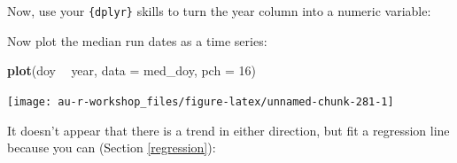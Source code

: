 \documentclass[]{book}
\newenvironment{Shaded}{\begin{snugshade}}{\end{snugshade}}
\newcommand{\CommentTok}[1]{\textcolor[rgb]{0.56,0.35,0.01}{\textit{#1}}}
\newcommand{\DataTypeTok}[1]{\textcolor[rgb]{0.13,0.29,0.53}{#1}}
\newcommand{\DecValTok}[1]{\textcolor[rgb]{0.00,0.00,0.81}{#1}}
\newcommand{\KeywordTok}[1]{\textcolor[rgb]{0.13,0.29,0.53}{\textbf{#1}}}
\newcommand{\NormalTok}[1]{#1}
\newcommand{\OperatorTok}[1]{\textcolor[rgb]{0.81,0.36,0.00}{\textbf{#1}}}
\newcommand{\StringTok}[1]{\textcolor[rgb]{0.31,0.60,0.02}{#1}}
\begin{document}
Now, use your \texttt{\{dplyr\}} skills to turn the year column into a numeric variable:

\begin{Shaded}
\end{Shaded}

Now plot the median run dates as a time series:

\begin{Shaded}
\begin{Highlighting}[]
\KeywordTok{plot}\NormalTok{(doy }\OperatorTok{~}\StringTok{ }\NormalTok{year, }\DataTypeTok{data =}\NormalTok{ med_doy, }\DataTypeTok{pch =} \DecValTok{16}\NormalTok{)}
\end{Highlighting}
\end{Shaded}

\begin{center}\texttt{[image: au-r-workshop\_files/figure-latex/unnamed-chunk-281-1]} \end{center}

It doesn't appear that there is a trend in either direction, but fit a regression line because you can (Section \ref{regression}):

\begin{Shaded}
\end{Shaded}
\end{document}
